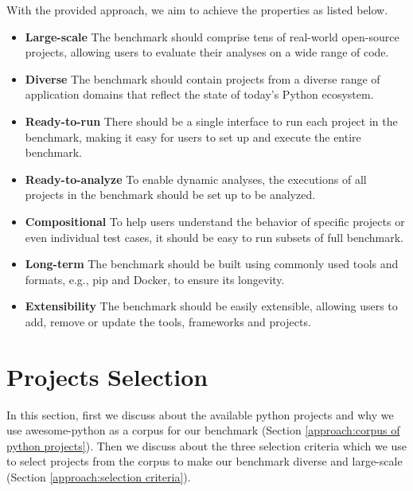 With the provided approach, we aim to achieve the properties as listed below.
\begin{itemize}
    \item \textbf{Large-scale} The benchmark should comprise tens of real-world open-source projects, allowing users to evaluate their analyses on a wide range of code.
    \item \textbf{Diverse} The benchmark should contain projects from a diverse range of application domains that reflect the state of today's Python ecosystem.
    \item \textbf{Ready-to-run} There should be a single interface to run each project in the benchmark, making it easy for users to set up and execute the entire benchmark.
    \item \textbf{Ready-to-analyze} To enable dynamic analyses, the executions of all projects in the benchmark should be set up to be analyzed.
    \item \textbf{Compositional} To help users understand the behavior of specific projects or even individual test cases, it should be easy to run subsets of full benchmark.
    \item \textbf{Long-term} The benchmark should be built using commonly used tools and formats, e.g., pip and Docker, to ensure its longevity.
    \item \textbf{Extensibility} The benchmark should be easily extensible, allowing users to add, remove or update the tools, frameworks and projects.  
\end{itemize}

\section{Projects Selection}
\label{approach:project selection}
In this section, first we discuss about the available python projects and why we use awesome-python as a corpus for our benchmark (Section \ref{approach:corpus of python projects}).
Then we discuss about the three selection criteria which we use to select projects from the corpus to make our benchmark diverse and large-scale (Section \ref{approach:selection criteria}).
